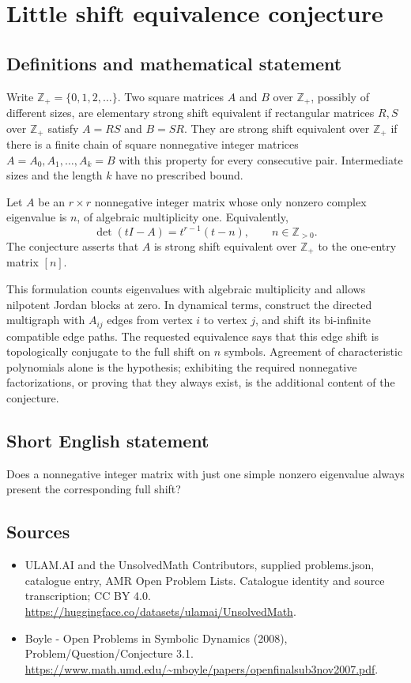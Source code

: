 \documentclass[11pt,a4paper]{article}
\begin{document}
\section*{Little shift equivalence conjecture}\label{statement}

\subsection{Definitions and mathematical statement}
Write $\mathbb Z_+=\{0,1,2,\ldots\}$. Two square matrices $A$ and $B$ over
$\mathbb Z_+$, possibly of different sizes, are elementary strong shift
equivalent if rectangular matrices $R,S$ over $\mathbb Z_+$ satisfy
$A=RS$ and $B=SR$. They are strong shift equivalent over $\mathbb Z_+$
if there is a finite chain of square nonnegative integer matrices
$A=A_0,A_1,\ldots,A_k=B$ with this property for every consecutive pair.
Intermediate sizes and the length $k$ have no prescribed bound.

Let $A$ be an $r\times r$ nonnegative integer matrix whose only nonzero
complex eigenvalue is $n$, of algebraic multiplicity one. Equivalently,
\[
 \det(tI-A)=t^{r-1}(t-n),\qquad n\in\mathbb Z_{>0}.
\]
The conjecture asserts that $A$ is strong shift equivalent over $\mathbb Z_+$
to the one-entry matrix $[n]$.

This formulation counts eigenvalues with algebraic multiplicity and allows
nilpotent Jordan blocks at zero. In dynamical terms, construct the directed
multigraph with $A_{ij}$ edges from vertex $i$ to vertex $j$, and shift its
bi-infinite compatible edge paths. The requested equivalence says that this
edge shift is topologically conjugate to the full shift on $n$ symbols.
Agreement of characteristic polynomials alone is the hypothesis; exhibiting
the required nonnegative factorizations, or proving that they always exist,
is the additional content of the conjecture.
\subsection{Short English statement}
Does a nonnegative integer matrix with just one simple nonzero eigenvalue always present the corresponding full shift?
\subsection{Sources}
\begin{itemize}
\item[S1] ULAM.AI and the UnsolvedMath Contributors, supplied problems.json, catalogue entry, AMR Open Problem Lists. Catalogue identity and source transcription; CC BY 4.0.
\url{https://huggingface.co/datasets/ulamai/UnsolvedMath}.
\item[S2] Boyle - Open Problems in Symbolic Dynamics (2008), Problem/Question/Conjecture 3.1. 
\url{https://www.math.umd.edu/~mboyle/papers/openfinalsub3nov2007.pdf}.
\end{itemize}
\end{document}

